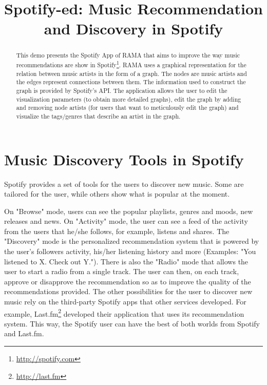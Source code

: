 \documentclass{article}
\title{Spotify-ed: Music Recommendation and Discovery in Spotify}
\begin{document}
%
\maketitle
%
\begin{abstract}
  This demo presents the Spotify App\cite{spotifyapps} of RAMA \cite{ramaapp} that aims to improve the way music recommendations are show in Spotify\footnote{\url{http://spotify.com}}.
  RAMA uses a graphical representation for the relation between music artists in the form of a graph. The nodes are music artists and the edges represent connections between them.
  The information used to construct the graph is provided by Spotify's API.
  The application allows the user to edit the visualization parameters (to obtain more detailed graphs), edit the graph by adding and removing node artists (for users that want to meticulously edit the graph) and visualize the tags/genres that describe an artist in the graph.


\end{abstract}

  \section{Music Discovery Tools in Spotify} %
  \label{sec:spotify_tools}
  
    Spotify provides a set of tools for the users to discover new music.
    Some are tailored for the user, while others show what is popular at the moment.

    On "Browse" mode, users can see the popular playlists, genres and moods, new releases and news.
    On "Activity" mode, the user can see a feed of the activity from the users that he/she follows, for example, listens and shares.
    The "Discovery" mode is the personalized recommendation system that is powered by the user's followers activity, his/her listening history and more (Examples: "You listened to X. Check out Y.").
    There is also the "Radio" mode that allows the user to start a radio from a single track.
    The user can then, on each track, approve or disapprove the recommendation so as to improve the quality of the recommendations provided.
    The other possibilities for the user to discover new music rely on the third-party Spotify apps that other services developed. 
    For example, Last.fm\footnote{\url{http://last.fm}} developed their application that uses its recommendation system. 
    This way, the Spotify user can have the best of both worlds from Spotify and Last.fm.
\end{document}
